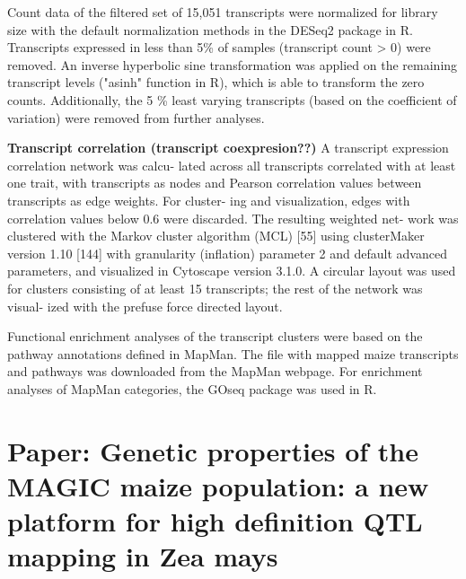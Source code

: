 \documentclass[a4paper,10pt]{article}
\begin{document}
Count data of the filtered set of 15,051 transcripts were normalized for library size with the default normalization methods in the DESeq2 package in R.
Transcripts expressed in less than 5\% of samples (transcript count > 0) were removed. 
An inverse hyperbolic sine transformation was applied on the remaining transcript levels ("asinh" function in R), which is able to transform the zero counts. 
Additionally, the 5 \% least varying transcripts (based on the coefficient of variation) were removed from further analyses.

\textbf{Transcript correlation (transcript coexpresion??)}
A transcript expression correlation network was calcu-
lated across all transcripts correlated with at least one
trait, with transcripts as nodes and Pearson correlation
values between transcripts as edge weights. For cluster-
ing and visualization, edges with correlation values
below 0.6 were discarded. The resulting weighted net-
work was clustered with the Markov cluster algorithm
(MCL) [55] using clusterMaker version 1.10 [144] with
granularity (inflation) parameter 2 and default advanced
parameters, and visualized in Cytoscape version 3.1.0.
A circular layout was used for clusters consisting of at
least 15 transcripts; the rest of the network was visual-
ized with the prefuse force directed layout.



Functional enrichment analyses of the transcript clusters were based on the pathway annotations defined in MapMan.
The file with mapped maize transcripts and pathways was downloaded from the MapMan webpage. For enrichment analyses of MapMan categories, the GOseq package was used in R.










\section{Paper: Genetic properties of the MAGIC maize population: a new platform for high definition QTL mapping in Zea mays}
\end{document}
